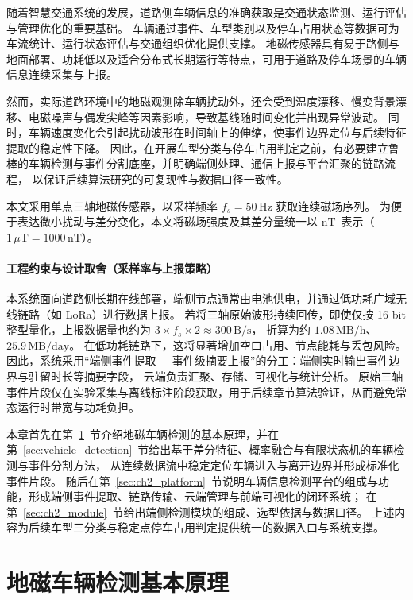 \documentclass{xdupgthesis}
\newcommand{\Fs}{\ensuremath{50\,\mathrm{Hz}}}
\newcommand{\MagUnit}{\ensuremath{\mathrm{nT}}}
\begin{document}
随着智慧交通系统的发展，道路侧车辆信息的准确获取是交通状态监测、运行评估与管理优化的重要基础\cite{its_overview,traffic_monitoring}。
车辆通过事件、车型类别以及停车占用状态等数据可为车流统计、运行状态评估与交通组织优化提供支撑\cite{vehicle_event_application}。
地磁传感器具有易于路侧与地面部署、功耗低以及适合分布式长期运行等特点，可用于道路及停车场景的车辆信息连续采集与上报\cite{magnetic_sensor_traffic}。

然而，实际道路环境中的地磁观测除车辆扰动外，还会受到温度漂移、慢变背景漂移、电磁噪声与偶发尖峰等因素影响，导致基线随时间变化并出现异常波动。
同时，车辆速度变化会引起扰动波形在时间轴上的伸缩，使事件边界定位与后续特征提取的稳定性下降。
因此，在开展车型分类与停车占用判定之前，有必要建立鲁棒的车辆检测与事件分割底座，并明确端侧处理、通信上报与平台汇聚的链路流程，
以保证后续算法研究的可复现性与数据口径一致性。

本文采用单点三轴地磁传感器，以采样频率 $f_s = \Fs$ 获取连续磁场序列。
为便于表达微小扰动与差分变化，本文将磁场强度及其差分量统一以 \MagUnit\ 表示（$1\,\mu\mathrm{T}=1000\,\mathrm{nT}$）。

\paragraph{工程约束与设计取舍（采样率与上报策略）}
本系统面向道路侧长期在线部署，端侧节点通常由电池供电，并通过低功耗广域无线链路（如 LoRa）进行数据上报。
若将三轴原始波形持续回传，即使仅按 16 bit 整型量化，上报数据量也约为
$3 \times f_s \times 2 \approx 300\,\mathrm{B/s}$，
折算为约 $1.08\,\mathrm{MB/h}$、$25.9\,\mathrm{MB/day}$。
在低功耗链路下，这将显著增加空口占用、节点能耗与丢包风险。
因此，系统采用“端侧事件提取 + 事件级摘要上报”的分工：端侧实时输出事件边界与驻留时长等摘要字段，
云端负责汇聚、存储、可视化与统计分析。
原始三轴事件片段仅在实验采集与离线标注阶段获取，用于后续章节算法验证，从而避免常态运行时带宽与功耗负担。

本章首先在第~\ref{sec:ch2_principle}~节介绍地磁车辆检测的基本原理，并在第~\ref{sec:vehicle_detection}~节给出基于差分特征、概率融合与有限状态机的车辆检测与事件分割方法，
从连续数据流中稳定定位车辆进入与离开边界并形成标准化事件片段。
随后在第~\ref{sec:ch2_platform}~节说明车辆信息检测平台的组成与功能，形成端侧事件提取、链路传输、云端管理与前端可视化的闭环系统；
在第~\ref{sec:ch2_module}~节给出端侧检测模块的组成、选型依据与数据口径。
上述内容为后续车型三分类与稳定点停车占用判定提供统一的数据入口与系统支撑。

\section{地磁车辆检测基本原理}\label{sec:ch2_principle}
\end{document}
